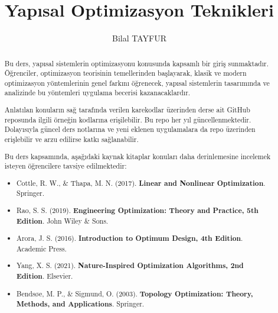 \documentclass{article}
\title{Yapısal Optimizasyon Teknikleri}
\author{Bilal TAYFUR}
\begin{document}
\begin{titlepage}
\thispagestyle{empty}
\maketitle

\begin{abstract}
Bu ders, yapısal sistemlerin optimizasyonu konusunda kapsamlı bir giriş sunmaktadır. Öğrenciler, optimizasyon teorisinin temellerinden başlayarak, klasik ve modern optimizasyon yöntemlerinin genel farkını öğrenecek, yapısal sistemlerin tasarımında ve analizinde bu yöntemleri uygulama becerisi kazanacaklardır. 

Anlatılan konuların sağ tarafında verilen karekodlar üzerinden derse ait GitHub reposunda ilgili örneğin kodlarına erişilebilir. Bu repo her yıl güncellenmektedir. Dolayısıyla güncel ders notlarına ve yeni eklenen uygulamalara da repo üzerinden erişlebilir ve arzu edilirse katkı sağlanabilir.

\vspace{10pt}
\begin{center}
\end{center}




\vspace{10pt}
\noindent Bu ders kapsamında, aşağıdaki kaynak kitaplar konuları daha derinlemesine incelemek isteyen öğrencilere tavsiye edilmektedir:

\begin{itemize}
    \item Cottle, R. W., \& Thapa, M. N. (2017). \textbf{Linear and Nonlinear Optimization}. Springer.
    \item Rao, S. S. (2019). \textbf{Engineering Optimization: Theory and Practice, 5th Edition}. John Wiley \& Sons.
    \item Arora, J. S. (2016). \textbf{Introduction to Optimum Design, 4th Edition}. Academic Press.
    \item Yang, X. S. (2021). \textbf{Nature-Inspired Optimization Algorithms, 2nd Edition}. Elsevier.
    \item Bendsøe, M. P., \& Sigmund, O. (2003). \textbf{Topology Optimization: Theory, Methods, and Applications}. Springer.
\end{itemize}

\end{abstract}

\setcounter{tocdepth}{3}
\tableofcontents
\end{titlepage}


  
  
  
  
  
  
  
  
  
  
  
  
  
  
\end{document}
